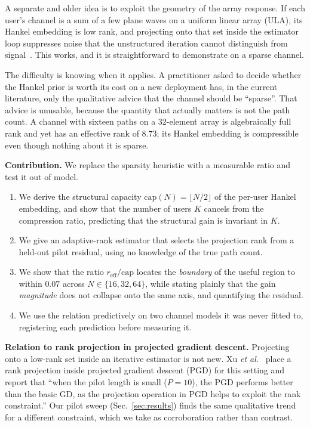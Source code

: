 \documentclass[journal]{IEEEtran}
\newcommand{\reff}{r_{\mathrm{eff}}}
\begin{document}
A separate and older idea is to exploit the geometry of the array response. If
each user's channel is a sum of a few plane waves on a uniform linear array
(ULA), its Hankel embedding is low rank, and projecting onto that set inside
the estimator loop suppresses noise that the unstructured iteration cannot
distinguish from signal~\cite{cadzow1988,markovsky2008}. This works, and it is
straightforward to demonstrate on a sparse channel.

The difficulty is knowing when it applies. A practitioner asked to decide
whether the Hankel prior is worth its cost on a new deployment has, in the
current literature, only the qualitative advice that the channel should be
``sparse''. That advice is unusable, because the quantity that actually
matters is not the path count. A channel with sixteen paths on a
$32$-element array is algebraically full rank and yet has an effective rank of
$8.73$; its Hankel embedding is compressible even though nothing about it is
sparse.

\textbf{Contribution.} We replace the sparsity heuristic with a measurable
ratio and test it out of model.
\begin{enumerate}
\item We derive the structural capacity $\mathrm{cap}(N)=\lfloor N/2 \rfloor$
of the per-user Hankel embedding, and show that the number of users $K$
cancels from the compression ratio, predicting that the structural gain is
invariant in $K$.
\item We give an adaptive-rank estimator that selects the projection rank from
a held-out pilot residual, using no knowledge of the true path count.
\item We show that the ratio $\reff/\mathrm{cap}$ locates the \emph{boundary}
of the useful region to within $0.07$ across $N\in\{16,32,64\}$, while
stating plainly that the gain \emph{magnitude} does not collapse onto the same
axis, and quantifying the residual.
\item We use the relation predictively on two channel models it was never
fitted to, registering each prediction before measuring it.
\end{enumerate}

\textbf{Relation to rank projection in projected gradient descent.} Projecting
onto a low-rank set inside an iterative estimator is not new. Xu \emph{et
al.}~\cite{xu2025} place a rank projection inside projected gradient descent
(PGD) for this setting and report that ``when the pilot length is small
($P=10$), the PGD performs better than the basic GD, as the projection
operation in PGD helps to exploit the rank constraint.'' Our pilot sweep
(Sec.~\ref{sec:results}) finds the same qualitative trend for a different
constraint, which we take as corroboration rather than contrast.
\end{document}
